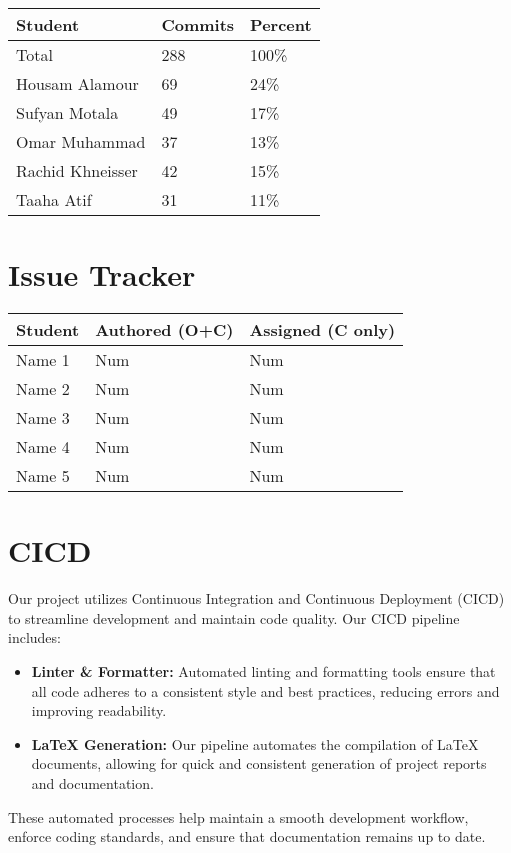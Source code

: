 \documentclass{article}
\begin{document}
\begin{table}[H]
\centering
\begin{tabular}{lll}
\toprule
\textbf{Student} & \textbf{Commits} & \textbf{Percent}\\
\midrule
Total & 288 & 100\% \\
Housam Alamour & 69 & 24\% \\
Sufyan Motala & 49 & 17\% \\
Omar Muhammad & 37 & 13\% \\
Rachid Khneisser & 42 & 15\% \\
Taaha Atif & 31 & 11\% \\
\bottomrule
\end{tabular}
\end{table}

\section{Issue Tracker}


\begin{table}[H]
\centering
\begin{tabular}{lll}
\toprule
\textbf{Student} & \textbf{Authored (O+C)} & \textbf{Assigned (C only)}\\
\midrule
Name 1 & Num & Num \\
Name 2 & Num & Num \\
Name 3 & Num & Num \\
Name 4 & Num & Num \\
Name 5 & Num & Num \\
\bottomrule
\end{tabular}
\end{table}


\section{CICD}

Our project utilizes Continuous Integration and Continuous Deployment (CICD) to streamline development and maintain code quality. Our CICD pipeline includes:

\begin{itemize}
    \item \textbf{Linter \& Formatter:} Automated linting and formatting tools ensure that all code adheres to a consistent style and best practices, reducing errors and improving readability.
    \item \textbf{LaTeX Generation:} Our pipeline automates the compilation of LaTeX documents, allowing for quick and consistent generation of project reports and documentation.
\end{itemize}

These automated processes help maintain a smooth development workflow, enforce coding standards, and ensure that documentation remains up to date.
\end{document}
